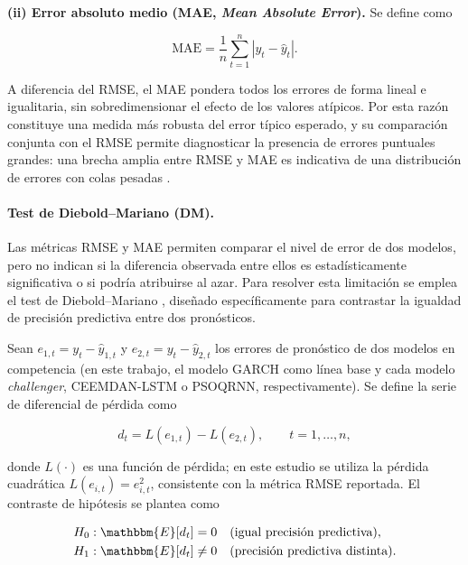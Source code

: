 \documentclass[12pt]{paper}
\begin{document}
\textbf{(ii) Error absoluto medio (MAE, \textit{Mean Absolute Error}).} Se define como

\begin{equation}
    \text{MAE} = \frac{1}{n}\sum_{t=1}^{n}\left|y_t - \hat{y}_t\right|.
\end{equation}

A diferencia del RMSE, el MAE pondera todos los errores de forma lineal e igualitaria, sin sobredimensionar el efecto de los valores atípicos. Por esta razón constituye una medida más robusta del error típico esperado, y su comparación conjunta con el RMSE permite diagnosticar la presencia de errores puntuales grandes: una brecha amplia entre RMSE y MAE es indicativa de una distribución de errores con colas pesadas \cite{willmott2005advantages}.

\paragraph{Test de Diebold--Mariano (DM).}
Las métricas RMSE y MAE permiten comparar el nivel de error de dos modelos, pero no indican si la diferencia observada entre ellos es estadísticamente significativa o si podría atribuirse al azar. Para resolver esta limitación se emplea el test de Diebold--Mariano \citep{diebold1995comparing}, diseñado específicamente para contrastar la igualdad de precisión predictiva entre dos pronósticos.

Sean $e_{1,t} = y_t - \hat{y}_{1,t}$ y $e_{2,t} = y_t - \hat{y}_{2,t}$ los errores de pronóstico de dos modelos en competencia (en este trabajo, el modelo GARCH como línea base y cada modelo \textit{challenger}, CEEMDAN-LSTM o PSOQRNN, respectivamente). Se define la serie de diferencial de pérdida como

\begin{equation}
    d_t = L(e_{1,t}) - L(e_{2,t}), \qquad t = 1, \ldots, n,
\end{equation}

donde $L(\cdot)$ es una función de pérdida; en este estudio se utiliza la pérdida cuadrática $L(e_{i,t}) = e_{i,t}^{2}$, consistente con la métrica RMSE reportada. El contraste de hipótesis se plantea como

\begin{equation}
\begin{aligned}
    H_0 &: \mathbbm{E}[d_t] = 0 \quad \text{(igual precisión predictiva)}, \\
    H_1 &: \mathbbm{E}[d_t] \neq 0 \quad \text{(precisión predictiva distinta)}.
\end{aligned}
\end{equation}
\end{document}
